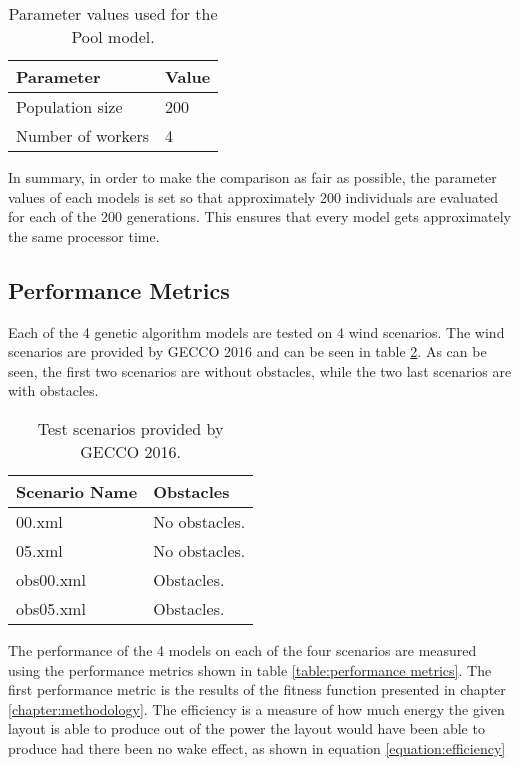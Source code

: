 \begin{table}[h!]
\centering
\caption{Parameter values used for the Pool model.}
\label{table:final parameter settings pool model}
\begin{tabular}{l|l}
\textbf{Parameter} & \textbf{Value} \\ 
\hline 
Population size & 200 \\  
Number of workers & 4 \\ 
\end{tabular}
\end{table}

\noindent In summary, in order to make the comparison as fair as possible, the parameter values of each models is set so that approximately 200 individuals are evaluated for each of the 200 generations. This ensures that every model gets approximately the same processor time.\\


\subsection{Performance Metrics}\label{subsection:performance metrics}
\noindent Each of the 4 genetic algorithm models are tested on 4 wind scenarios. The wind scenarios are provided by GECCO 2016 and can be seen in table \ref{table:scenario properties}. As can be seen, the first two scenarios are without obstacles, while the two last scenarios are with obstacles.\\

\begin{table}[h!]
\centering
\caption{Test scenarios provided by GECCO 2016.}
\label{table:scenario properties}
\begin{tabular}{l|l}
\textbf{Scenario Name} & \textbf{Obstacles} \\
\hline
00.xml            & No obstacles. \\
05.xml            & No obstacles. \\
obs00.xml         & Obstacles. \\
obs05.xml         & Obstacles. \\
\end{tabular}
\end{table}

\noindent The performance of the 4 models on each of the four scenarios are measured using the performance metrics shown in table \ref{table:performance metrics}. The first performance metric is the results of the fitness function presented in chapter \ref{chapter:methodology}. The efficiency is a measure of how much energy the given layout is able to produce out of the power the layout would have been able to produce had there been no wake effect, as shown in equation \ref{equation:efficiency}

